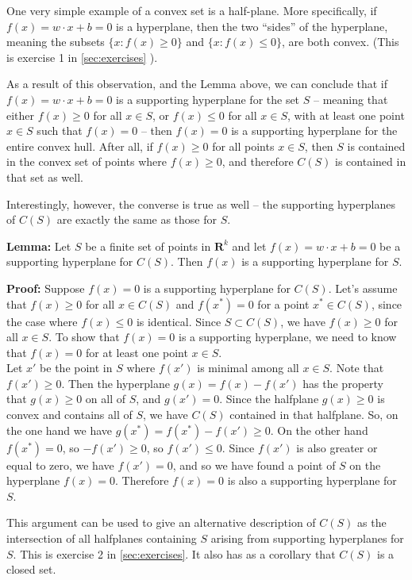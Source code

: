 \documentclass[
]{article}
\begin{document}
One very simple example of a convex set is a half-plane. More
specifically, if \(f(x)=w\cdot x+b=0\) is a hyperplane, then the two
``sides'' of the hyperplane, meaning the subsets \(\{x: f(x)\ge 0\}\)
and \(\{x: f(x)\le 0\}\), are both convex. (This is exercise 1 in
\cref{sec:exercises} ).

As a result of this observation, and the Lemma above, we can conclude
that if \(f(x)=w\cdot x+b=0\) is a supporting hyperplane for the set
\(S\) -- meaning that either \(f(x)\ge 0\) for all \(x\in S\), or
\(f(x)\le 0\) for all \(x\in S\), with at least one point \(x\in S\)
such that \(f(x)=0\) -- then \(f(x)=0\) is a supporting hyperplane for
the entire convex hull. After all, if \(f(x)\ge 0\) for all points
\(x\in S\), then \(S\) is contained in the convex set of points where
\(f(x)\ge 0\), and therefore \(C(S)\) is contained in that set as well.

Interestingly, however, the converse is true as well -- the supporting
hyperplanes of \(C(S)\) are exactly the same as those for \(S\).

\textbf{Lemma:} Let \(S\) be a finite set of points in
\(\mathbf{R}^{k}\) and let \(f(x)=w\cdot x +b=0\) be a supporting
hyperplane for \(C(S)\). Then \(f(x)\) is a supporting hyperplane for
\(S\).

\textbf{Proof:} Suppose \(f(x)=0\) is a supporting hyperplane for
\(C(S)\). Let's assume that \(f(x)\ge 0\) for all \(x\in C(S)\) and
\(f(x^{*})=0\) for a point \(x^{*}\in C(S)\), since the case where
\(f(x)\le 0\) is identical. Since \(S\subset C(S)\), we have
\(f(x)\ge 0\) for all \(x\in S\). To show that \(f(x)=0\) is a
supporting hyperplane, we need to know that \(f(x)=0\) for at least one
point \(x\in S\).\\
Let \(x'\) be the point in \(S\) where \(f(x')\) is minimal among all
\(x\in S\). Note that \(f(x')\ge 0\). Then the hyperplane
\(g(x) = f(x)-f(x')\) has the property that \(g(x)\ge 0\) on all of
\(S\), and \(g(x')=0\). Since the halfplane \(g(x)\ge 0\) is convex and
contains all of \(S\), we have \(C(S)\) contained in that halfplane. So,
on the one hand we have \(g(x^{*})=f(x^{*})-f(x')\ge 0\). On the other
hand \(f(x^{*})=0\), so \(-f(x')\ge 0\), so \(f(x')\le 0\). Since
\(f(x')\) is also greater or equal to zero, we have \(f(x')=0\), and so
we have found a point of \(S\) on the hyperplane \(f(x)=0\). Therefore
\(f(x)=0\) is also a supporting hyperplane for \(S\).

This argument can be used to give an alternative description of \(C(S)\)
as the intersection of all halfplanes containing \(S\) arising from
supporting hyperplanes for \(S\). This is exercise 2 in
\cref{sec:exercises}. It also has as a corollary that \(C(S)\) is a
closed set.
\end{document}
